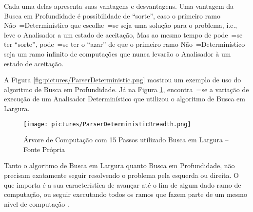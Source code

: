{    Cada uma delas apresenta suas vantagens e
    desvantagens.
    Uma vantagem da Busca em Profundidade é possibilidade de ``sorte'',
    caso o primeiro ramo Não~=Determinístico que escolhe~=se seja uma solução para o problema,
    i.e.,
    leve o Analisador a um estado de aceitação,
    Mas ao mesmo tempo de pode~=se ter ``sorte'',
    pode~=se ter o ``azar'' de que o primeiro ramo Não~=Determinístico seja um ramo infinito de computações que nunca levarão o Analisador à um estado de aceitação.

    A Figura \ref{fig:pictures/ParserDeterministic.png} mostrou um exemplo de uso do algoritmo de Busca em Profundidade.
    Já na Figura \ref{fig:pictures/ParserDeterministicBreadth.png},
    encontra~=se a variação de execução de um Analisador Determinístico que utilizou o algoritmo de Busca em Largura.
    \begin{figure}[h]
    \centering
    \texttt{[image: pictures/ParserDeterministicBreadth.png]}
    \caption{Árvore de Computação com 15 Passos utilizado Busca em Largura -- Fonte Própria}
    \label{fig:pictures/ParserDeterministicBreadth.png}
    \end{figure}

    Tanto o algoritmo de Busca em Largura quanto Busca em Profundidade,
    não precisam exatamente seguir resolvendo o problema pela esquerda ou
    direita.
    O que importa é a sua característica de avançar até o fim de algum dado ramo de computação,
    ou seguir executando todos os ramos que fazem parte de um mesmo nível de computação \cite{cormenIntroductionToAlgorithms,efficientBreadthFirstSearch}.
}


